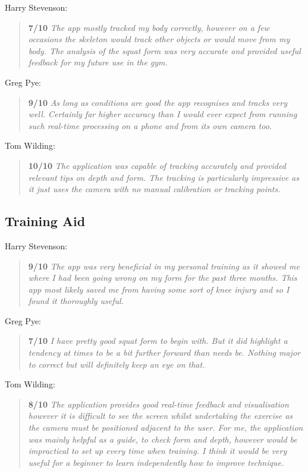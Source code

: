 Harry Stevenson:
\begin{quote}
\textbf{7/10} \emph{The app mostly tracked my body correctly, however on a few occasions the skeleton would track other objects or would move from my body. The analysis of the squat form was very accurate and provided useful feedback for my future use in the gym.}
\end{quote}

Greg Pye:
\begin{quote}
\textbf{9/10} \emph{As long as conditions are good the app recognises and tracks very well. Certainly far higher accuracy than I would ever expect from running such real-time processing on a phone and from its own camera too.}
\end{quote}

Tom Wilding:
\begin{quote}
\textbf{10/10} \emph{The application was capable of tracking accurately and provided relevant tips on depth and form. The tracking is particularly impressive as it just uses the camera with no manual calibration or tracking points.}
\end{quote}

\pagebreak
\subsection{Training Aid}

Harry Stevenson:
\begin{quote}
\textbf{9/10} \emph{The app was very beneficial in my personal training as it showed me where I had been going wrong on my form for the past three months. This app most likely saved me from having some sort of knee injury and so I found it thoroughly useful.}
\end{quote}

Greg Pye:
\begin{quote}
\textbf{7/10} \emph{I have pretty good squat form to begin with. But it did highlight a tendency at times to be a bit further forward than needs be. Nothing major to correct but will definitely keep an eye on that.}
\end{quote}

Tom Wilding:
\begin{quote}
\textbf{8/10} \emph{The application provides good real-time feedback and visualisation however it is difficult to see the screen whilst undertaking the exercise as the camera must be positioned adjacent to the user. For me, the application was mainly helpful as a guide, to check form and depth, however would be impractical to set up every time when training. I think it would be very useful for a beginner to learn independently how to improve technique.}
\end{quote}

